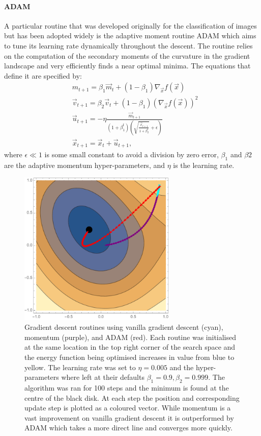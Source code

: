 \paragraph{ADAM}
A particular routine that was developed originally for the classification of images but has been adopted widely is the adaptive moment routine ADAM which aims to tune its learning rate dynamically throughout the descent. The routine relies on the computation of the secondary moments of the curvature in the gradient landscape and very efficiently finds a near optimal minima. The equations that define it are specified by:
\begin{align}
&m_{t+1} = \beta_1 \vec{m}_t + (1 - \beta_1) \nabla_{\vec{x}} f(\vec{x})\\
&\vec{v}_{t+1} = \beta_2 \vec{v}_t + (1 - \beta_1) (\nabla_{\vec{x}} f(\vec{x}))^2\\
& \vec{u}_{t+1} = -\eta \frac{\vec{m}_{t+1}}{(1+\beta_1^t)\left(\sqrt{\frac{\vec{v}_{t+1}}{1+\beta_2^t}} + \epsilon\right)}\\
& \vec{x}_{t+1} = \vec{x}_t + \vec{u}_{t+1},
\end{align}
where $\epsilon \ll 1$ is some small constant to avoid a division by zero error, $\beta_1$ and $\beta2$ are the adaptive momentum hyper-parameters, and $\eta$ is the learning rate.
\begin{figure}[h!]
	\centering
	\includegraphics[width = 0.67\textwidth]{images/introduction/momentum}
	\def\c{Gradient descent routines using vanilla gradient descent (cyan), momentum (purple), and ADAM (red)}
	\caption[\c]{\c. Each routine was initialised at the same location in the top right corner of the search space and the energy function being optimised increases in value from blue to yellow. The learning rate was set to $\eta = 0.005$ and the hyper-parameters where left at their defaults $\beta_1 = 0.9, \beta_2 = 0.999$. The algorithm was ran for 100 steps and the minimum is found at the centre of the black disk. At each step the position and corresponding update step is plotted as a coloured vector. While momentum is a vast improvement on vanilla gradient descent it is outperformed by ADAM which takes a more direct line and converges more quickly. \label{fig:momemtum}} 
\end{figure}
